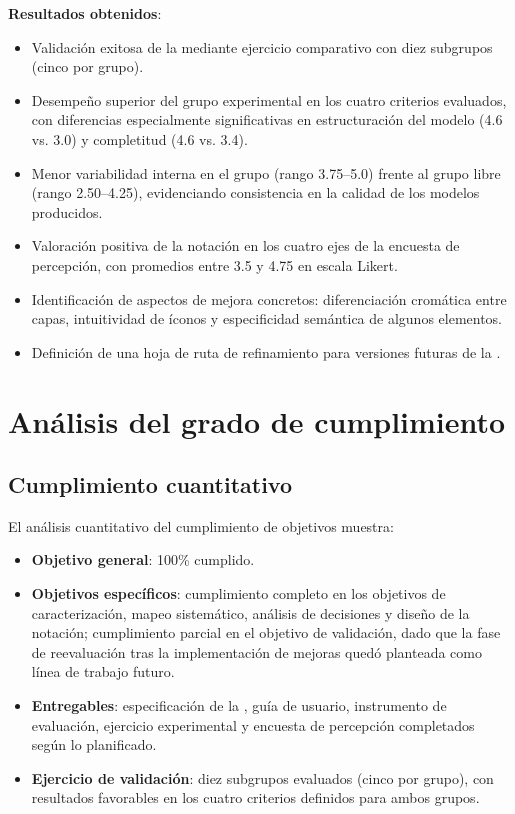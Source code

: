\textbf{Resultados obtenidos}:
\begin{itemize}
    \item Validación exitosa de la \NDITI mediante ejercicio comparativo con diez subgrupos (cinco por grupo).
    \item Desempeño superior del grupo experimental en los cuatro criterios evaluados, con diferencias especialmente significativas en estructuración del modelo (4.6 vs. 3.0) y completitud (4.6 vs. 3.4).
    \item Menor variabilidad interna en el grupo \NDITI (rango 3.75--5.0) frente al grupo libre (rango 2.50--4.25), evidenciando consistencia en la calidad de los modelos producidos.
    \item Valoración positiva de la notación en los cuatro ejes de la encuesta de percepción, con promedios entre 3.5 y 4.75 en escala Likert.
    \item Identificación de aspectos de mejora concretos: diferenciación cromática entre capas, intuitividad de íconos y especificidad semántica de algunos elementos.
    \item Definición de una hoja de ruta de refinamiento para versiones futuras de la \NDITI.
\end{itemize}

\section{Análisis del grado de cumplimiento}
\noindent

\subsection{Cumplimiento cuantitativo}
\noindent

El análisis cuantitativo del cumplimiento de objetivos muestra:

\begin{itemize}
    \item \textbf{Objetivo general}: 100\% cumplido.
    \item \textbf{Objetivos específicos}: cumplimiento completo en los objetivos de caracterización, mapeo sistemático, análisis de decisiones y diseño de la notación; cumplimiento parcial en el objetivo de validación, dado que la fase de reevaluación tras la implementación de mejoras quedó planteada como línea de trabajo futuro.
    \item \textbf{Entregables}: especificación de la \NDITI, guía de usuario, instrumento de evaluación, ejercicio experimental y encuesta de percepción completados según lo planificado.
    \item \textbf{Ejercicio de validación}: diez subgrupos evaluados (cinco por grupo), con resultados favorables en los cuatro criterios definidos para ambos grupos.
\end{itemize}

